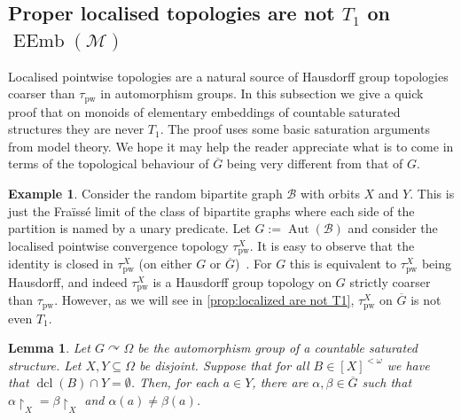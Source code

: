 \documentclass{article}
\newtheorem{lemma}[theorem]{Lemma}
\theoremstyle{remark}
\theoremstyle{definition}
\newtheorem{example}[theorem]{Example}
\def\acts{\curvearrowright}
\DeclareMathOperator{\dcl}{dcl}
\DeclareMathOperator{\Aut}{Aut}
\DeclareMathOperator{\EEmb}{EEmb}
\newcommand{\M}[0]{\mathcal{M}}
\newcommand{\pw}[0]{\tau_{\mathrm{pw}}}
\begin{document}
{{{{{\subsection{{Proper} localised topologies {are not \texorpdfstring{$T_1$}{T1} on 
\texorpdfstring{$\EEmb(\M)$}{monoids of elementary embeddings}} }\label{sub:localised}

 Localised pointwise topologies are a natural source of Hausdorff group topologies coarser than $\pw$ in automorphism groups. In this subsection we give a quick proof that on monoids of elementary embeddings of countable saturated structures they are never $T_1$. The proof uses some basic saturation arguments from model theory. We hope it may help the reader appreciate what is to come in terms of the topological behaviour of $\overline{G}$ being very different from that of $G$.

 \begin{example}\label{ex:bipartite}  Consider the random bipartite graph $\mathcal{B}$ with orbits  $X$ and $Y$. This is just the Fra\"{i}ss\'{e} limit of the class of bipartite graphs where each side of the partition is named by a unary predicate.  Let $G:=\Aut(\mathcal{B})$ and consider the localised pointwise convergence topology $\pw^X$. It is easy to observe that the identity is closed in $\pw^X$ (on either $G$ or $\overline{G}$)~\cite[Example 3D]{ghaddln24}. For $G$ this is equivalent to $\pw^X$ being Hausdorff, and indeed $\pw^X$ is a Hausdorff group topology on $G$ strictly coarser than $\pw$. However, as we will see in \cref{prop:localized are not T1}, $\pw^X$ on $\overline{G}$ is not even $T_1$.
  \end{example}

\begin{lemma}\label{lem:saturatedcase} Let $G\acts\Omega$ be the automorphism group of a countable saturated structure. Let $X,Y\subseteq\Omega$ be disjoint. Suppose that for all $B\in[X]^{<\omega}$ %
{we have that} $\dcl(B)\cap Y=\emptyset$. Then, for each $a\in Y$, there are $\alpha, \beta\in\overline{G}$ such that $\alpha\upharpoonright_X=\beta\upharpoonright_X$ and $\alpha(a)\neq\beta(a)$. 



\end{lemma}}}}}}
\end{document}
